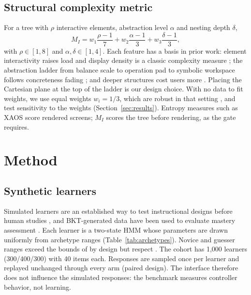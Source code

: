 \documentclass[conference]{IEEEtran}
\begin{document}
\subsection{Structural complexity metric}
For a tree with $\rho$ interactive elements, abstraction level $\alpha$ and
nesting depth $\delta$,
\begin{equation}
M_I = w_1\frac{\rho-1}{7} + w_2\frac{\alpha-1}{3} + w_3\frac{\delta-1}{3},
\end{equation}
with $\rho\in[1,8]$ and $\alpha,\delta\in[1,4]$.
Each feature has a basis in prior work: element interactivity raises load \cite{sweller2010element}
and display density is a classic complexity measure \cite{tullis1983formatting};
the abstraction ladder from balance scale to operation pad to symbolic
workspace follows concreteness fading \cite{fyfe2014concreteness}; and
deeper structures cost users more \cite{kiger1984depth}.
Placing the Cartesian plane at the top of the ladder is our design choice.
With no data to fit weights, we use equal weights $w_i=1/3$, which are robust
in that setting \cite{dawes1979robust}, and test sensitivity to the weights
(Section~\ref{sec:results}). Entropy measures such as XAOS \cite{stickel2010xaos} score
rendered screens; $M_I$ scores the tree before rendering, as the gate requires.

\section{Method}
\label{sec:method}

\subsection{Synthetic learners}
Simulated learners are an established way to test instructional designs
before human studies \cite{vanlehn1994simulated,kaser2024simulated}, and
BKT-generated data have been used to evaluate mastery assessment
\cite{fancsali2013optimal}. Each learner is a two-state
HMM whose parameters are drawn uniformly from archetype ranges
(Table~\ref{tab:archetypes}). Novice and guesser ranges exceed the bounds
of \cite{corbett1995knowledge} by design but respect
\cite{vandesande2013properties}. The cohort has 1,000 learners
(300/400/300) with 40 items each. Responses are sampled once per learner and
replayed unchanged through every arm (paired design). The interface therefore
does not influence the simulated responses: the benchmark measures controller
behavior, not learning.
\end{document}
